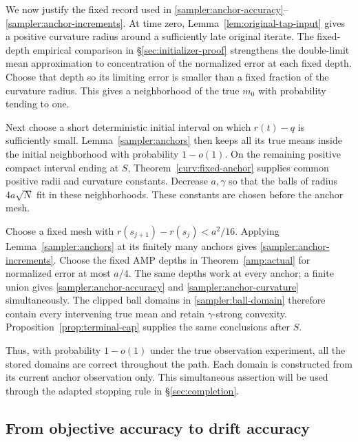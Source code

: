 \documentclass[11pt,reqno]{amsart}
\begin{document}
We now justify the fixed record used in \eqref{sampler:anchor-accuracy}--\eqref{sampler:anchor-increments}. At time zero, Lemma~\ref{lem:original-tap-input} gives a positive curvature radius around a sufficiently late original iterate. The fixed-depth empirical comparison in \S\ref{sec:initializer-proof} strengthens the double-limit mean approximation to concentration of the normalized error at each fixed depth. Choose that depth so its limiting error is smaller than a fixed fraction of the curvature radius. This gives a neighborhood of the true $m_0$ with probability tending to one.

Next choose a short deterministic initial interval on which $r(t)-q$ is sufficiently small. Lemma~\ref{sampler:anchors} then keeps all its true means inside the initial neighborhood with probability $1-o(1)$. On the remaining positive compact interval ending at $S$, Theorem~\ref{curv:fixed-anchor} supplies common positive radii and curvature constants. Decrease $a,\gamma$ so that the balls of radius $4a\sqrt N$ fit in these neighborhoods. These constants are chosen before the anchor mesh.

Choose a fixed mesh with $r(s_{j+1})-r(s_j)<a^2/16$. Applying Lemma~\ref{sampler:anchors} at its finitely many anchors gives \eqref{sampler:anchor-increments}. Choose the fixed AMP depths in Theorem~\ref{amp:actual} for normalized error at most $a/4$. The same depths work at every anchor; a finite union gives \eqref{sampler:anchor-accuracy} and \eqref{sampler:anchor-curvature} simultaneously. The clipped ball domains in \eqref{sampler:ball-domain} therefore contain every intervening true mean and retain $\gamma$-strong convexity. Proposition~\ref{prop:terminal-cap} supplies the same conclusions after $S$.

Thus, with probability $1-o(1)$ under the true observation experiment, all the stored domains are correct throughout the path. Each domain is constructed from its current anchor observation only. This simultaneous assertion will be used through the adapted stopping rule in \S\ref{sec:completion}.

\subsection{From objective accuracy to drift accuracy}
\end{document}
